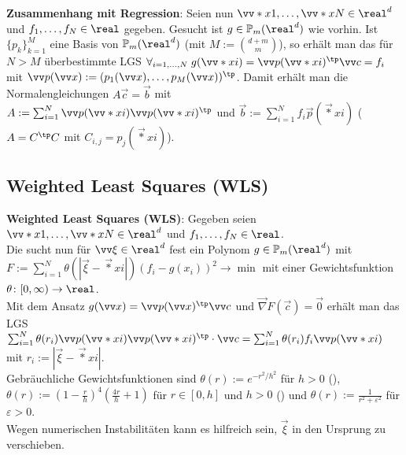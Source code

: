 \textbf{Zusammenhang mit Regression}:
Seien nun $\vec*{x}{1}, \dotsc, \vec*{x}{N} \in \real^d$ und $f_1, \dotsc, f_N \in \real$
gegeben.
Gesucht ist $g \in \PP_m(\real^d)$ wie vorhin.
Ist $\{p_k\}_{k=1}^M$ eine Basis von $\PP_m(\real^d)$
(mit $M := \binom{d+m}{m}$),
so erhält man das für $N > M$ überbestimmte LGS
$\forall_{i=1,\dotsc,N}\; g(\vec*{x}{i}) = \vec{p}(\vec*{x}{i})^\tp \vec{c} = f_i$
mit $\vec{p}(\vec{x}) := (p_1(\vec{x}), \dotsc, p_M(\vec{x}))^\tp$.
Damit erhält man die Normalengleichungen
$A\vec{c} = \vec{b}$ mit\\
$A := \sum_{i=1}^N \vec{p}(\vec*{x}{i}) \vec{p}(\vec*{x}{i})^\tp$ und
$\vec{b} := \sum_{i=1}^N f_i \vec{p}(\vec*{x}{i})$
($A = C^\tp C$ mit $C_{i,j} = p_j(\vec*{x}{i})$).

\subsection{%
    Weighted Least Squares (WLS)%
}

\textbf{Weighted Least Squares (WLS)}:
Gegeben seien $\vec*{x}{1}, \dotsc, \vec*{x}{N} \in \real^d$ und
$f_1, \dotsc, f_N \in \real$.\\
Die  sucht nun für $\vec{\xi} \in \real^d$ fest
ein Polynom $g \in \PP_m(\real^d)$ mit\\
$F := \sum_{i=1}^N \theta(|\vec{\xi} - \vec*{x}{i}|) (f_i - g(x_i))^2 \to \min$
mit einer Gewichtsfunktion $\theta\colon [0, \infty) \to \real$.\\
Mit dem Ansatz $g(\vec{x}) = \vec{p}(\vec{x})^\tp \vec{c}$ und
$\vec{\nabla} F(\vec{c}) = \vec{0}$ erhält man das LGS\\
$\sum_{i=1}^N \theta(r_i) \vec{p}(\vec*{x}{i}) \vec{p}(\vec*{x}{i})^\tp \cdot \vec{c}
= \sum_{i=1}^N \theta(r_i) f_i \vec{p}(\vec*{x}{i})$ mit $r_i := |\vec{\xi} - \vec*{x}{i}|$.\\
Gebräuchliche Gewichtsfunktionen sind
$\theta(r) := e^{-r^2/h^2}$ für $h > 0$ (),\\
$\theta(r) := (1 - \frac{r}{h})^4 (\frac{4r}{h} + 1)$ für $r \in [0, h]$ und $h > 0$
() und
$\theta(r) := \frac{1}{r^2 + \varepsilon^2}$ für $\varepsilon > 0$.\\
Wegen numerischen Instabilitäten kann es hilfreich sein,
$\vec{\xi}$ in den Ursprung zu verschieben.

\linie

